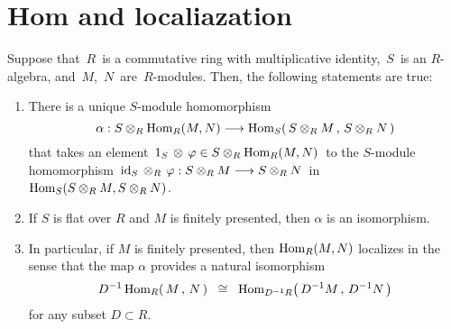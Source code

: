 

\section{Hom and localiazation}
\setcounter{theorem}{0}
\setcounter{equation}{0}


\renewcommand{\theenumi}{\roman{enumi}}
\renewcommand{\labelenumi}{\textnormal{(\theenumi)}$\;\;$}


\begin{proposition}
\label{HomAndLocalization}
\mbox{}
\vskip 0.1cm
\noindent
Suppose that \,$R$\, is a commutative ring with multiplicative identity, \,$S$\, is an $R$-algebra, and \,$M$,\, $N$\, are \,$R$-modules.
Then, the following statements are true:
\begin{enumerate}
\item
	There is a unique $S$-module homomorphism
	\begin{equation*}
	\alpha : S \otimes_{R} \textnormal{Hom}_{R}(M,N) \longrightarrow \textnormal{Hom}_{S}\!\left(\,S\otimes_{R}M\,,\,S\otimes_{R}N\,\right)
	\end{equation*}
	that takes an element
	\,$1_{S}\,\otimes\,\varphi \in S \otimes_{R} \textnormal{Hom}_{R}(M, N)$\,
	to the $S$-module homomorphism
	\,$\textnormal{id}_{S} \,\otimes_{R}\, \varphi : S \otimes_{R} M \longrightarrow S \otimes_{R} N$\,
	in
	\,$\textnormal{Hom}_{S}(S \otimes_{R} M, S \otimes_{R} N)$.
\item
	If $S$ is flat over $R$ and $M$ is finitely presented, then $\alpha$ is an isomorphism.
\item
	In particular, if $M$ is finitely presented, then $\textnormal{Hom}_{R}(M, N)$ localizes in the
	sense that the map $\alpha$ provides a natural isomorphism
	\begin{equation*}
	D^{-1}\,\textnormal{Hom}_{R}\!\left(\,M\,,\,N\,\right)
	\;\;\cong\;\;
		\textnormal{Hom}_{D^{-1}R}\!\left(\,D^{-1}M\,,\,D^{-1}N\,\right)
	\end{equation*}
	for any subset $D \subset R$.
\end{enumerate}
\end{proposition}
\proof

